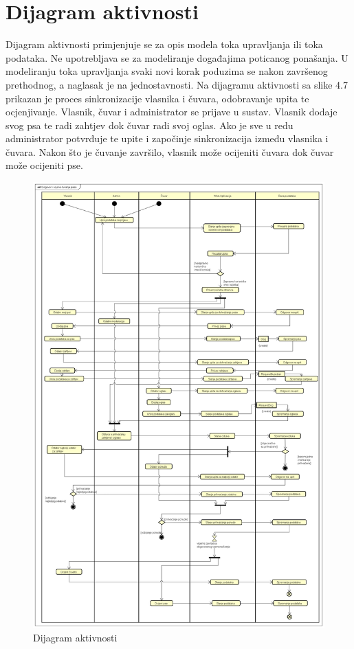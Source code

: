 			\eject 
		
		\section{Dijagram aktivnosti}
			
			Dijagram aktivnosti primjenjuje se za opis modela toka upravljanja ili toka podataka. Ne upotrebljava se za modeliranje događajima poticanog ponašanja. U
			modeliranju toka upravljanja svaki novi korak poduzima se nakon završenog prethodnog, a naglasak je na jednostavnosti. Na dijagramu aktivnosti sa slike 4.7 prikazan je proces sinkronizacije vlasnika i čuvara, odobravanje upita te ocjenjivanje. Vlasnik, čuvar i administrator se prijave u sustav. Vlasnik dodaje svog psa te radi zahtjev dok čuvar radi svoj oglas.
			Ako je sve u redu administrator potvrđuje te upite i započinje sinkronizacija između vlasnika i čuvara. Nakon što je čuvanje završilo, vlasnik može ocijeniti čuvara dok čuvar može ocijeniti pse.
			
			
			
			\begin{figure}[H]
				\centering
				\includegraphics[width=15cm]{slike/Dijagram aktivnosti}
				\caption{Dijagram aktivnosti}
				\label{fig:Activity-Diagram}
			\end{figure}
			
